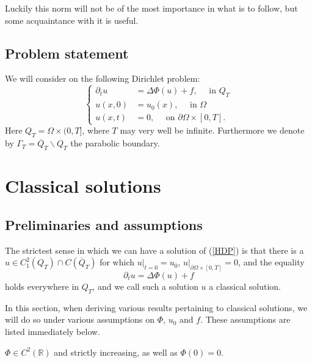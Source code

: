 \documentclass[11pt, a4paper]{article}
\begin{document}
Luckily this norm will not be of the most importance in what is to follow, but some acquaintance with it is useful.

 
 
\subsection{Problem statement}
We will consider on the following Dirichlet problem:
\begin{equation}
\label{HDP}
	\begin{cases}
		\partial_t u &= \Delta \Phi(u) + f, \quad \text{ in } Q_T \\
		u(x,0) &= u_0(x), \quad \text{ in } \Omega \\
		u(x,t) &= 0, \quad \text{ on } \partial\Omega \times [0,T].
	\end{cases}
\end{equation}
Here $Q_T = \Omega \times (0,T]$, where $T$ may very well be infinite. Furthermore we denote by $\Gamma_T = \overline{Q}_T\backslash Q_T$ the parabolic boundary.



\section{Classical solutions}
\subsection{Preliminaries and assumptions}
The strictest sense in which we can have a solution of (\ref{HDP}) is that there is a $u \in C^2_1(Q_T)\cap C(\overline{Q}_T)$ for which $u\big|_{t=0} = u_0$,  $u\big|_{\partial\Omega \times [0,T]} = 0$, and the equality
\begin{equation*}
\partial_t u = \Delta \Phi(u) + f
\end{equation*}
holds everywhere in $Q_T$, and we call such a solution $u$ a classical solution.

In this section, when deriving various results pertaining to classical solutions, we will do so under various assumptions on $\Phi$, $u_0$ and $f$. These assumptions are listed immediately below.

\begin{assumption}
\label{ass:classical_Phi_smooth}
$\Phi \in C^2(\mathbb{R})$ and strictly increasing, as well as $\Phi(0) = 0$.
\end{assumption}
\end{document}
